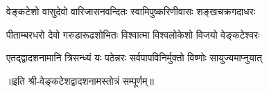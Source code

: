 

\twolineshloka
{वेङ्कटेशो वासुदेवो वारिजासनवन्दितः}
{स्वामिपुष्करिणीवासः शङ्खचक्रगदाधरः}

\twolineshloka
{पीताम्बरधरो देवो गरुडारूढशोभितः}
{विश्वात्मा विश्वलोकेशो विजयो वेङ्कटेश्वरः}

\twolineshloka
{एतद्द्वादशनामानि त्रिसन्ध्यं यः पठेन्नरः}
{सर्वपापविनिर्मुक्तो विष्णोः सायुज्यमाप्नुयात्}

॥इति श्री-वेङ्कटेशद्वादशनामस्तोत्रं सम्पूर्णम्॥

